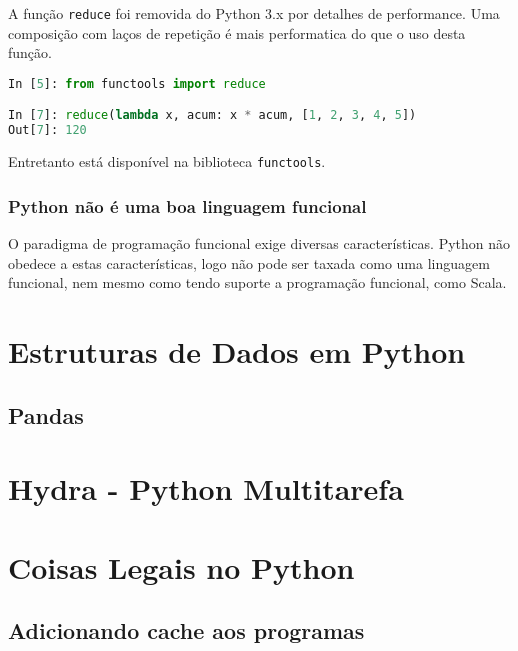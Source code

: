 \documentclass[aspectratio=169]{beamer}
\begin{document}
\begin{frame}[fragile]
    A função \texttt{reduce} foi removida do Python 3.x por detalhes de performance.
Uma composição com laços de repetição é mais performatica do que o uso desta função.
    \begin{lstlisting}[language=python]
In [5]: from functools import reduce

In [7]: reduce(lambda x, acum: x * acum, [1, 2, 3, 4, 5])
Out[7]: 120
    \end{lstlisting}
    Entretanto está disponível na biblioteca \texttt{functools}.
\end{frame}

\begin{frame}
    \frametitle{Python não é uma boa linguagem funcional}
    O paradigma de programação funcional exige diversas características. Python não
obedece a estas características, logo não pode ser taxada como uma linguagem funcional,
nem mesmo como tendo suporte a programação funcional, como Scala.
\end{frame}


\section{Estruturas de Dados em Python}

\subsection{Pandas}



\section{Hydra - Python Multitarefa}



\section{Coisas Legais no Python}

\subsection{Adicionando cache aos programas}
\end{document}
